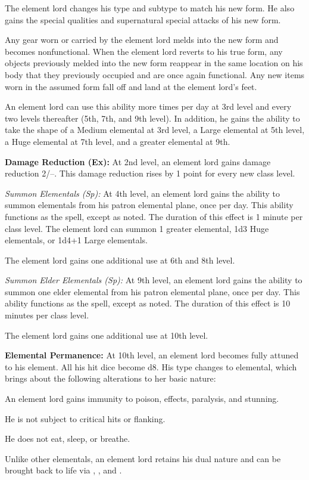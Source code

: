 {The element lord changes his type and subtype to match his new form. He also gains the special qualities and supernatural special attacks of his new form.

Any gear worn or carried by the element lord melds into the new form and becomes nonfunctional. When the element lord reverts to his true form, any objects previously melded into the new form reappear in the same location on his body that they previously occupied and are once again functional. Any new items worn in the assumed form fall off and land at the element lord's feet.

An element lord can use this ability more times per day at 3rd level and every two levels thereafter (5th, 7th, and 9th level). In addition, he gains the ability to take the shape of a Medium elemental at 3rd level, a Large elemental at 5th level, a Huge elemental at 7th level, and a greater elemental at 9th.

\textbf{Damage Reduction (Ex):} At 2nd level, an element lord gains damage reduction 2/--. This damage reduction rises by 1 point for every new class level.

\textit{Summon Elementals (Sp):} At 4th level, an element lord gains the ability to summon elementals from his patron elemental plane, once per day. This ability functions as the  spell, except as noted. The duration of this effect is 1 minute per class level. The element lord can summon 1 greater elemental, 1d3 Huge elementals, or 1d4+1 Large elementals.

The element lord gains one additional use at 6th and 8th level.

\textit{Summon Elder Elementals (Sp):} At 9th level, an element lord gains the ability to summon one elder elemental from his patron elemental plane, once per day. This ability functions as the  spell, except as noted. The duration of this effect is 10 minutes per class level.

The element lord gains one additional use at 10th level.

\textbf{Elemental Permanence:} At 10th level, an element lord becomes fully attuned to his element. All his hit dice become d8. His type changes to elemental, which brings about the following alterations to her basic nature:
\begin{itemize*}
\item An element lord gains immunity to poison,  effects, paralysis, and stunning.
\item He is not subject to critical hits or flanking.
\item He does not eat, sleep, or breathe.
\item Unlike other elementals, an element lord retains his dual nature and can be brought back to life via , , and .
\end{itemize*}

}
